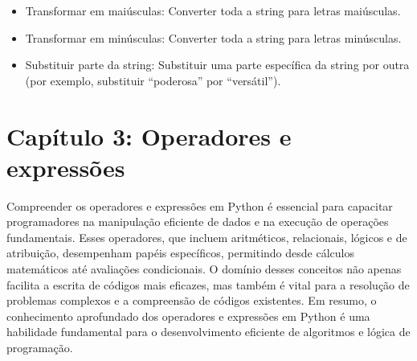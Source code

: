 \documentclass[letterpaper,10pt,english]{jupyterBook}
\begin{document}
\begin{itemize}
\item {} 
\sphinxAtStartPar
Transformar em maiúsculas: Converter toda a string para letras maiúsculas.

\item {} 
\sphinxAtStartPar
Transformar em minúsculas: Converter toda a string para letras minúsculas.

\item {} 
\sphinxAtStartPar
Substituir parte da string: Substituir uma parte específica da string por outra (por exemplo, substituir “poderosa” por “versátil”).

\end{itemize}

\sphinxstepscope


\chapter{Capítulo 3: Operadores e expressões}
\label{\detokenize{chapters/ch3/ch3:capitulo-3-operadores-e-expressoes}}\label{\detokenize{chapters/ch3/ch3::doc}}
\sphinxAtStartPar
Compreender os operadores e expressões em Python é essencial para capacitar programadores na manipulação eficiente de dados e na execução de operações fundamentais. Esses operadores, que incluem aritméticos, relacionais, lógicos e de atribuição, desempenham papéis específicos, permitindo desde cálculos matemáticos até avaliações condicionais. O domínio desses conceitos não apenas facilita a escrita de códigos mais eficazes, mas também é vital para a resolução de problemas complexos e a compreensão de códigos existentes. Em resumo, o conhecimento aprofundado dos operadores e expressões em Python é uma habilidade fundamental para o desenvolvimento eficiente de algoritmos e lógica de programação.
\end{document}
